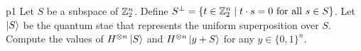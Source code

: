 \documentclass[a4paper, 11pt]{article}
\begin{document}
\begin{problem}{%
	}{p1%
	}
	Let $S$ be a subspace of $\mathbb{Z}_2^n$. Define $S^{\perp}=\{t\in \mathbb{Z}_2^n\mid t\cdot s=0\text{ for all }s\in S\}$. Let $\ket{S}$ be the quantum stae that represents the uniform superposition over $S$. Compute the values of $H^{\otimes n}\ket{S}$ and $H^{\otimes n}\ket{y+S}$ for any $y\in \{0,1\}^n$.	
\end{problem}

\solve{
}

	
\end{document}
